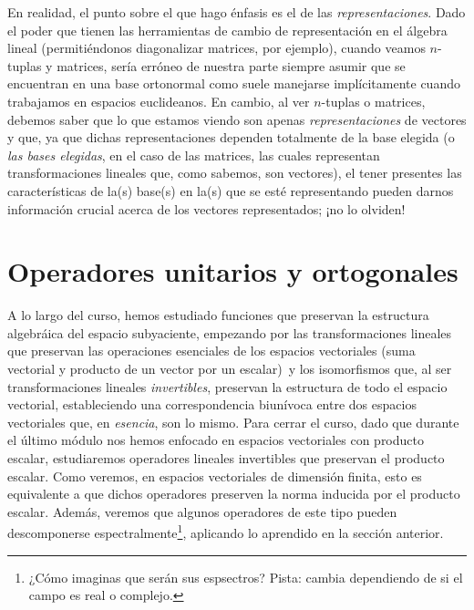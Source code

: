 \documentclass[12pt,dvipsnames]{article}
\begin{document}
\begin{tcolorbox}
\vspace{3mm}
\hspace{2.5mm} En realidad, el punto sobre el que hago énfasis es el de las \emph{representaciones}. Dado el poder que tienen las herramientas de cambio de representación en el álgebra lineal (permitiéndonos diagonalizar matrices, por ejemplo), cuando veamos $n$-tuplas y matrices, sería erróneo de nuestra parte siempre asumir que se encuentran en una base ortonormal \textemdash como suele manejarse implícitamente cuando trabajamos en espacios euclideanos. En cambio, al ver $n$-tuplas o matrices, debemos saber que lo que estamos viendo son apenas \emph{representaciones} de vectores y que, ya que dichas representaciones dependen totalmente de la base elegida (o \emph{las bases elegidas}, en el caso de las matrices, las cuales representan transformaciones lineales que, como sabemos, son vectores), el tener presentes las características de la(s) base(s) en la(s) que se esté representando pueden darnos información crucial acerca de los vectores representados; ¡no lo olviden!
\end{tcolorbox}

\newpage
\section{Operadores unitarios y ortogonales} \label{Sec:16} 

A lo largo del curso, hemos estudiado funciones que preservan la estructura algebráica del espacio subyaciente, empezando por las transformaciones lineales \textemdash que preservan las operaciones esenciales de los espacios vectoriales (suma vectorial y producto de un vector por un escalar)\textemdash \ y los isomorfismos \textemdash que, al ser transformaciones lineales \emph{invertibles}, preservan la estructura de todo el espacio vectorial, estableciendo una correspondencia biunívoca entre dos espacios vectoriales que, en \emph{esencia}, son lo mismo. Para cerrar el curso, dado que durante el último módulo nos hemos enfocado en espacios vectoriales con producto escalar, estudiaremos operadores lineales invertibles que preservan el producto escalar. Como veremos, en espacios vectoriales de dimensión finita, esto es equivalente a que dichos operadores preserven la norma inducida por el producto escalar. Además, veremos que algunos operadores de este tipo pueden descomponerse espectralmente\footnote{¿Cómo imaginas que serán sus espsectros? Pista: cambia dependiendo de si el campo es real o complejo.}, aplicando lo aprendido en la sección anterior.
\end{document}
